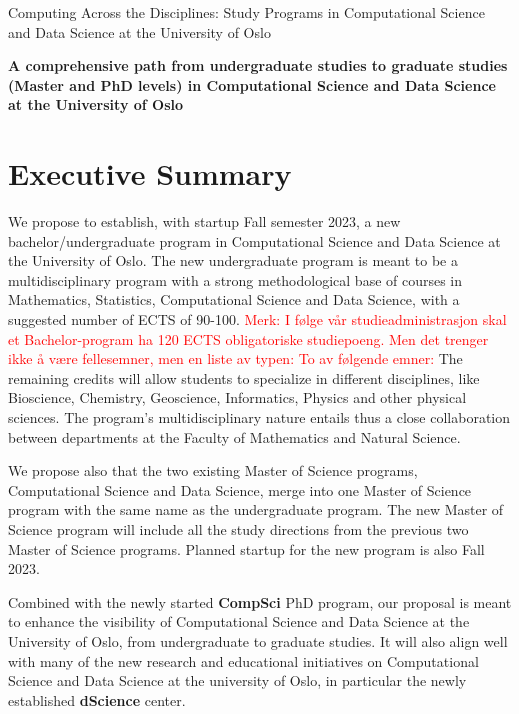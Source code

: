 \documentclass[oneside,final,10pt]{article}
\begin{document}
\thispagestyle{empty}

\begin{center}
{\LARGE\bf
\begin{spacing}{1.25}
Computing Across the Disciplines: Study Programs in Computational Science and Data Science at the University of Oslo
\end{spacing}
}
\end{center}

\begin{center}
{\bf A comprehensive path from undergraduate studies to graduate studies (Master and PhD levels) in Computational Science and Data Science at the University of Oslo }\\ [0mm]
\end{center}


\vspace{1cm}


\section*{Executive Summary}

We propose to establish, with startup Fall semester 2023, a new bachelor/undergraduate program in Computational Science and Data Science at the University of Oslo. 
The new undergraduate program is meant to be a multidisciplinary program with  a strong methodological base of courses in Mathematics, Statistics, Computational Science and Data Science, with a suggested number of ECTS of 90-100. \textcolor{red} {Merk: I f\o{}lge v\aa{}r studieadministrasjon skal et Bachelor-program ha 120 ECTS obligatoriske studiepoeng. Men det trenger ikke \aa{} v\ae{}re fellesemner, men en liste av typen: To av f\o{}lgende emner:} The remaining credits will allow students to specialize in different disciplines, like Bioscience, Chemistry, Geoscience, Informatics, Physics and other physical sciences. The program's multidisciplinary nature entails thus a close collaboration between departments at the Faculty of Mathematics and Natural Science.  

We propose also that the two existing Master of Science programs, Computational Science and Data Science, merge into one Master of Science program with the same name as the undergraduate program. The new Master of Science program will include all the study directions from the previous two Master of Science programs. Planned startup for the new program is also Fall 2023. 

Combined with the newly started {\bf CompSci} PhD program, our proposal is meant to enhance the visibility of Computational Science and Data Science at the University of Oslo, from undergraduate to graduate studies. It will also align well with many of the new research and educational initiatives on Computational Science and Data Science at the university of Oslo, in particular the newly established {\bf dScience} center. 
\end{document}
